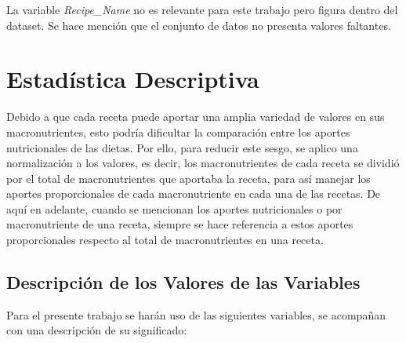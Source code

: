 \documentclass[12pt,a4paper]{article}
\begin{document}
        La variable \emph{Recipe\_Name} no es relevante para este trabajo pero figura 
        dentro del dataset. Se hace mención que el conjunto de datos no presenta 
        valores faltantes.

\newpage

\section{Estadística Descriptiva}

    Debido a que cada receta puede aportar una amplia variedad de valores 
    en sus macronutrientes, esto podría dificultar la comparación entre 
    los aportes nutricionales de las dietas. Por ello, para reducir este 
    sesgo, se aplico una normalización a los valores, es decir, 
    los macronutrientes de cada receta se dividió por el total de macronutrientes 
    que aportaba la receta, para así manejar los aportes proporcionales de 
    cada macronutriente en cada una de las recetas. De aquí en adelante, cuando 
    se mencionan los aportes nutricionales o por macronutriente de una receta, 
    siempre se hace referencia a estos aportes proporcionales respecto al total de 
    macronutrientes en una receta. 

    \subsection{Descripción de los Valores de las Variables}

        Para el presente trabajo se harán uso de las siguientes variables, se 
        acompañan con una descripción de su significado:
\end{document}
